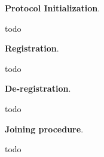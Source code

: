 \textbf{Protocol Initialization}.\label{apndx:init-protocol}
\begin{protocol}
    \caption{$\textsf{Initialization}(P, \text{sid})$}
    \begin{algorithmic}[1]

        todo
    \end{algorithmic}\label{alg:init-protocol}
\end{protocol}

\bigbreak
\bigbreak
\noindent
{}
\textbf{Registration}.\label{apndx:reg-protocol}
\begin{protocol}
    \caption{$\textsf{Registration}(P, \text{sid})$}
    \begin{algorithmic}[1]

        todo
    \end{algorithmic}\label{alg:reg-protocol}
\end{protocol}


\bigbreak
\bigbreak
\noindent
{}
\textbf{De-registration}.\label{apndx:dereg-protocol}
\begin{protocol}
    \caption{$\textsf{De-registration}(P, \text{sid})$}
    \begin{algorithmic}[1]

        todo
    \end{algorithmic}\label{alg:dereg-protocol}
\end{protocol}


\bigbreak
\bigbreak
\noindent
{}
\textbf{Joining procedure}.\label{apndx:join-protocol}
\begin{protocol}
    \caption{$\textsf{JoinProc}(P, \text{sid})$}
    \begin{algorithmic}[1]

        todo
    \end{algorithmic}\label{alg:join-protocol}
\end{protocol}



